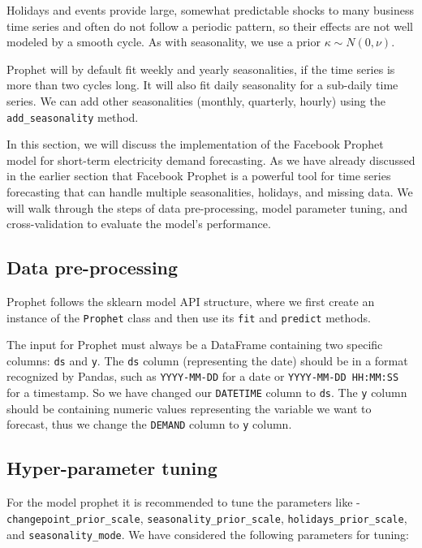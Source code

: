 \documentclass[mstat,12pt]{unswthesis}
\begin{document}
Holidays and events provide large, somewhat predictable shocks to many
business time series and often do not follow a periodic pattern, so
their effects are not well modeled by a smooth cycle. As with
seasonality, we use a prior \(\kappa \sim {N(0,\nu)}\).

Prophet will by default fit weekly and yearly seasonalities, if the time
series is more than two cycles long. It will also fit daily seasonality
for a sub-daily time series. We can add other seasonalities (monthly,
quarterly, hourly) using the \texttt{add\_seasonality} method.

In this section, we will discuss the implementation of the Facebook
Prophet model for short-term electricity demand forecasting. As we have
already discussed in the earlier section that Facebook Prophet is a
powerful tool for time series forecasting that can handle multiple
seasonalities, holidays, and missing data. We will walk through the
steps of data pre-processing, model parameter tuning, and
cross-validation to evaluate the model's performance.

\subsection{Data pre-processing}\label{data-pre-processing}

Prophet follows the sklearn model API structure, where we first create
an instance of the \texttt{Prophet} class and then use its \texttt{fit}
and \texttt{predict} methods.

The input for Prophet must always be a DataFrame containing two specific
columns: \texttt{ds} and \texttt{y}. The \texttt{ds} column
(representing the date) should be in a format recognized by Pandas, such
as \texttt{YYYY-MM-DD} for a date or \texttt{YYYY-MM-DD\ HH:MM:SS} for a
timestamp. So we have changed our \texttt{DATETIME} column to
\texttt{ds}. The \texttt{y} column should be containing numeric values
representing the variable we want to forecast, thus we change the
\texttt{DEMAND} column to \texttt{y} column.

\subsection{Hyper-parameter tuning}\label{hyper-parameter-tuning}

For the model prophet it is recommended to tune the parameters like -
\linebreak \texttt{changepoint\_prior\_scale},
\texttt{seasonality\_prior\_scale}, \texttt{holidays\_prior\_scale}, and
\texttt{seasonality\_mode}. We have considered the following parameters
for tuning:
\end{document}
